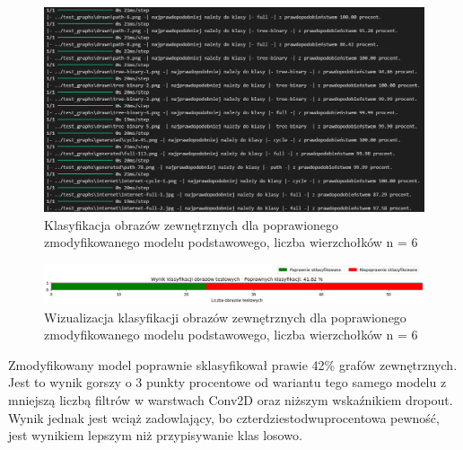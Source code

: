 \begin{figure}[ht]
	\centering
	\includegraphics[width=14cm]{resources/tests/images/v4/base6_1_1_txt.png}
	\caption{Klasyfikacja obrazów zewnętrznych dla poprawionego zmodyfikowanego modelu podstawowego, liczba wierzchołków n = 6}
	\label{Fig:tests-best-2b}
\end{figure}
\FloatBarrier

\begin{figure}[ht]
	\centering
	\includegraphics[width=14cm]{resources/tests/images/v4/base6_1_1_bar.png}
	\caption{Wizualizacja klasyfikacji obrazów zewnętrznych dla poprawionego zmodyfikowanego modelu podstawowego, liczba wierzchołków n = 6}
	\label{Fig:tests-best-1c}
\end{figure}
\FloatBarrier

Zmodyfikowany model poprawnie sklasyfikował prawie 42\% grafów zewnętrznych.
Jest to wynik gorszy o 3 punkty procentowe od wariantu tego samego modelu
z mniejszą liczbą filtrów w warstwach Conv2D oraz niższym wskaźnikiem dropout.
Wynik jednak jest wciąż zadowlający, bo czterdziestodwuprocentowa pewność,
jest wynikiem lepszym niż przypisywanie klas losowo.

